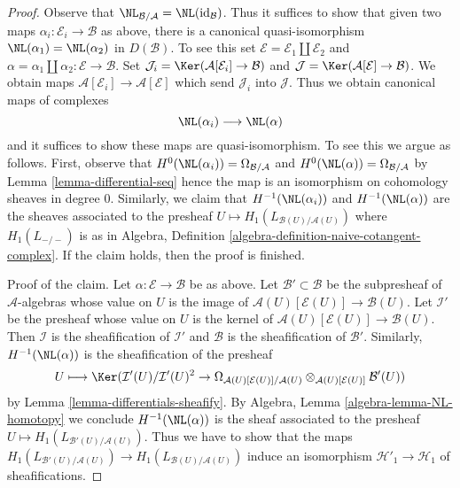 \begin{proof}
Observe that $\NL_{\mathcal{B}/\mathcal{A}} = \NL(\text{id}_\mathcal{B})$.
Thus it suffices to show that given two maps
$\alpha_i : \mathcal{E}_i \to \mathcal{B}$ as above, there is a
canonical quasi-isomorphism $\NL(\alpha_1) = \NL(\alpha_2)$ in $D(\mathcal{B})$.
To see this set $\mathcal{E} = \mathcal{E}_1 \amalg \mathcal{E}_2$ and
$\alpha = \alpha_1 \amalg \alpha_2 : \mathcal{E} \to \mathcal{B}$.
Set
$\mathcal{J}_i = \Ker(\mathcal{A}[\mathcal{E}_i] \to \mathcal{B})$
and
$\mathcal{J} = \Ker(\mathcal{A}[\mathcal{E}] \to \mathcal{B})$.
We obtain maps $\mathcal{A}[\mathcal{E}_i] \to \mathcal{A}[\mathcal{E}]$
which send $\mathcal{J}_i$ into $\mathcal{J}$.
Thus we obtain canonical maps of complexes
$$
\NL(\alpha_i) \longrightarrow \NL(\alpha)
$$
and it suffices to show these maps are quasi-isomorphism. To see this
we argue as follows. First, observe that
$H^0(\NL(\alpha_i)) = \Omega_{\mathcal{B}/\mathcal{A}}$ and
$H^0(\NL(\alpha)) = \Omega_{\mathcal{B}/\mathcal{A}}$ by
Lemma \ref{lemma-differential-seq}
hence the map is an isomorphism on cohomology sheaves in degree $0$.
Similarly, we claim that $H^{-1}(\NL(\alpha_i))$ and $H^{-1}(\NL(\alpha))$
are the sheaves associated to the presheaf
$U \mapsto H_1(L_{\mathcal{B}(U)/\mathcal{A}(U)})$ where
$H_1(L_{-/-})$ is as in
Algebra, Definition \ref{algebra-definition-naive-cotangent-complex}.
If the claim holds, then the proof is finished.

\medskip\noindent
Proof of the claim. Let $\alpha : \mathcal{E} \to \mathcal{B}$
be as above. Let $\mathcal{B}' \subset \mathcal{B}$ be the subpresheaf
of $\mathcal{A}$-algebras whose value on $U$ is the image of
$\mathcal{A}(U)[\mathcal{E}(U)] \to \mathcal{B}(U)$. Let $\mathcal{I}'$
be the presheaf whose value on $U$ is the kernel of
$\mathcal{A}(U)[\mathcal{E}(U)] \to \mathcal{B}(U)$. Then $\mathcal{I}$
is the sheafification of $\mathcal{I}'$ and $\mathcal{B}$ is
the sheafification of $\mathcal{B}'$. Similarly,
$H^{-1}(\NL(\alpha))$ is the sheafification of the presheaf
$$
U \longmapsto
\Ker(\mathcal{I}'(U)/\mathcal{I}'(U)^2 \to
\Omega_{\mathcal{A}(U)[\mathcal{E}(U)]/\mathcal{A}(U)}
\otimes_{\mathcal{A}(U)[\mathcal{E}(U)]} \mathcal{B}'(U))
$$
by Lemma \ref{lemma-differentials-sheafify}.
By Algebra, Lemma \ref{algebra-lemma-NL-homotopy} we conclude
$H^{-1}(\NL(\alpha))$ is the sheaf associated to the presheaf
$U \mapsto H_1(L_{\mathcal{B}'(U)/\mathcal{A}(U)})$. Thus we have
to show that the maps
$H_1(L_{\mathcal{B}'(U)/\mathcal{A}(U)}) \to
H_1(L_{\mathcal{B}(U)/\mathcal{A}(U)})$ induce an isomorphism
$\mathcal{H}'_1 \to \mathcal{H}_1$ of sheafifications.


\end{proof}
